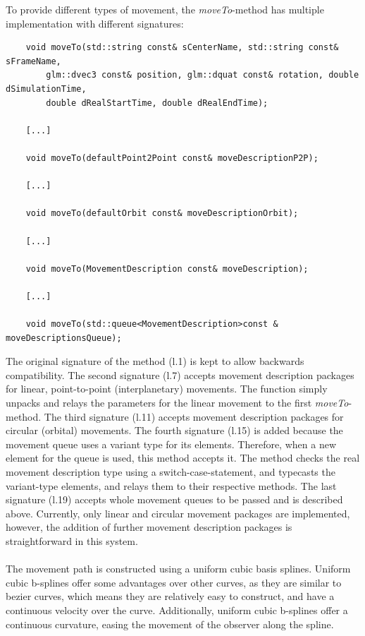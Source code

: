 To provide different types of movement, the \textit{moveTo}-method has multiple implementation with different
signatures:
\begin{verbatim}
    void moveTo(std::string const& sCenterName, std::string const& sFrameName,
        glm::dvec3 const& position, glm::dquat const& rotation, double dSimulationTime,
        double dRealStartTime, double dRealEndTime);

    [...]

    void moveTo(defaultPoint2Point const& moveDescriptionP2P);

    [...]

    void moveTo(defaultOrbit const& moveDescriptionOrbit);

    [...]

    void moveTo(MovementDescription const& moveDescription);

    [...]

    void moveTo(std::queue<MovementDescription>const & moveDescriptionsQueue);
\end{verbatim}
The original signature of the method (l.\@1) is kept to allow backwards compatibility.
The second signature (l.\@7) accepts movement description packages for linear, point-to-point (interplanetary)
movements.
The function simply unpacks and relays the parameters for the linear movement to the first \textit{moveTo}-method.
The third signature (l.\@11) accepts movement description packages for circular (orbital) movements.
The fourth signature (l.\@15) is added because the movement queue uses a variant type for its elements.
Therefore, when a new element for the queue is used, this method accepts it.
The method checks the real movement description type using a switch-case-statement, and typecasts the variant-type
elements, and relays them to their respective methods.
The last signature (l.\@19) accepts whole movement queues to be passed and is described above.
Currently, only linear and circular movement packages are implemented, however, the addition of further movement
description packages is straightforward in this system.
\\
\\
The movement path is constructed using a uniform cubic basis splines.
Uniform cubic b-splines offer some advantages over other curves, as they are similar to bezier curves, which means
they are relatively easy to construct, and have a continuous velocity over the curve.
Additionally, uniform cubic b-splines offer a continuous curvature, easing the movement of the observer along the
spline.
